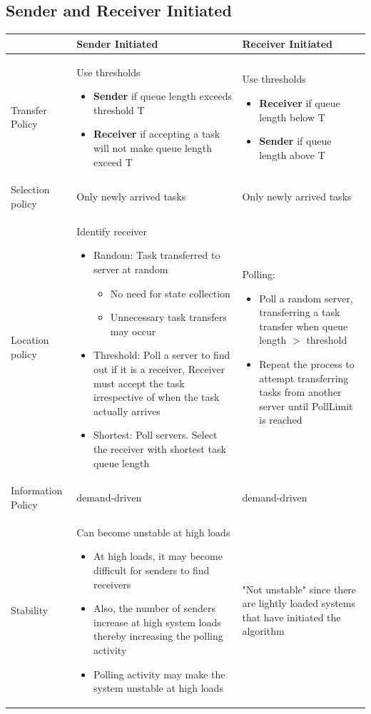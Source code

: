 \documentclass{article}[18pt]
\begin{document}
\subsection{Sender and Receiver Initiated}
{\renewcommand{\arraystretch}{2}
\begin{tabular}[t]{ | m{5em} | m{22em}| m{22em} | } 
\hline
&Sender Initiated&Receiver Initiated\\
\hline
Transfer Policy& Use thresholds
\begin{itemize}
	\item \textbf{Sender} if queue length exceeds threshold T
	\item \textbf{Receiver} if accepting a task will not make queue length exceed T 
\end{itemize}
& Use thresholds
\begin{itemize}
	\item \textbf{Receiver} if queue length below T
	\item \textbf{Sender} if queue length above T
\end{itemize}
\\
\hline
Selection policy& Only newly arrived tasks& Only newly arrived tasks\\
\hline
Location policy&
Identify receiver
\begin{itemize}
	\item Random: Task transferred to server at random
	\begin{itemize}
		\item No need for state collection
		\item Unnecessary task transfers may occur
	\end{itemize}
	\item Threshold: Poll a server to find out if it is a receiver, Receiver must accept the task irrespective of when the task actually arrives
	\item Shortest: Poll servers. Select the receiver with shortest task queue length
\end{itemize}
&
Polling:
\begin{itemize}
	\item Poll a random server, transferring a task transfer when queue length $>$ threshold
	\item Repeat the process to attempt transferring tasks from another server until PollLimit is reached
\end{itemize}\\
\hline
Information Policy& demand-driven&demand-driven\\


\hline
Stability& Can become unstable at high loads
\begin{itemize}
	\item At high loads, it may become difficult for senders to find receivers
	\item Also, the number of senders increase at high system loads thereby increasing the polling activity
	\item Polling activity may make the system unstable at high loads
\end{itemize}&
"Not unstable" since there are lightly loaded systems that have initiated the algorithm\\
\hline
\end{tabular}
}
\end{document}
